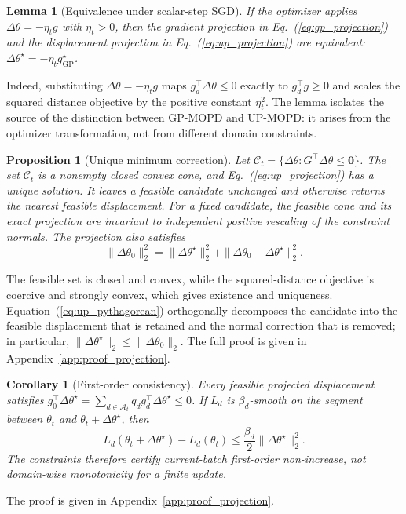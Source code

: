 \documentclass{article}
\newtheorem{proposition}{Proposition}
\newtheorem{corollary}{Corollary}
\newtheorem{lemma}{Lemma}
\begin{document}
\begin{lemma}[Equivalence under scalar-step SGD]
\label{lem:sgd_equivalence}
If the optimizer applies $\Delta\theta=-\eta_t g$ with $\eta_t>0$, then the
gradient projection in Eq.~(\ref{eq:gp_projection}) and the displacement
projection in Eq.~(\ref{eq:up_projection}) are equivalent:
$\Delta\theta^\star=-\eta_tg_{\mathrm{GP}}^\star$.
\end{lemma}
Indeed, substituting $\Delta\theta=-\eta_tg$ maps
$g_d^\top\Delta\theta\le0$ exactly to $g_d^\top g\ge0$ and scales the squared
distance objective by the positive constant $\eta_t^2$. The lemma isolates the
source of the distinction between GP-MOPD and UP-MOPD: it arises from the
optimizer transformation, not from different domain constraints.

\begin{proposition}[Unique minimum correction]
\label{prop:projection}
Let $\mathcal C_t=\{\Delta\theta:G^\top\Delta\theta\le\mathbf0\}$. The set
$\mathcal C_t$ is a nonempty closed convex cone, and
Eq.~(\ref{eq:up_projection}) has a unique solution. It leaves a feasible
candidate unchanged and otherwise returns the nearest feasible displacement.
For a fixed candidate, the feasible cone and its exact projection are invariant
to independent positive rescaling of the constraint normals. The projection
also satisfies
\begin{equation}
\|\Delta\theta_0\|_2^2
=\|\Delta\theta^\star\|_2^2
+\|\Delta\theta_0-\Delta\theta^\star\|_2^2.
\label{eq:up_pythagorean}
\end{equation}
\end{proposition}
The feasible set is closed and convex, while the squared-distance objective is
coercive and strongly convex, which gives existence and uniqueness.
Equation~(\ref{eq:up_pythagorean}) orthogonally decomposes the candidate into
the feasible displacement that is retained and the normal correction that is
removed; in particular,
$\|\Delta\theta^\star\|_2\le\|\Delta\theta_0\|_2$. The full proof is given in
Appendix~\ref{app:proof_projection}.

\begin{corollary}[First-order consistency]
\label{cor:mixed_first_order}
Every feasible projected displacement satisfies
$g_0^\top\Delta\theta^\star=
\sum_{d\in\mathcal A_t}q_dg_d^\top\Delta\theta^\star\le0$.
If $L_d$ is $\beta_d$-smooth on the segment between $\theta_t$ and
$\theta_t+\Delta\theta^\star$, then
\begin{equation}
L_d(\theta_t+\Delta\theta^\star)-L_d(\theta_t)
\le\frac{\beta_d}{2}\|\Delta\theta^\star\|_2^2.
\label{eq:finite_step_bound}
\end{equation}
The constraints therefore certify current-batch first-order non-increase, not
domain-wise monotonicity for a finite update.
\end{corollary}
The proof is given in Appendix~\ref{app:proof_projection}.
\end{document}

